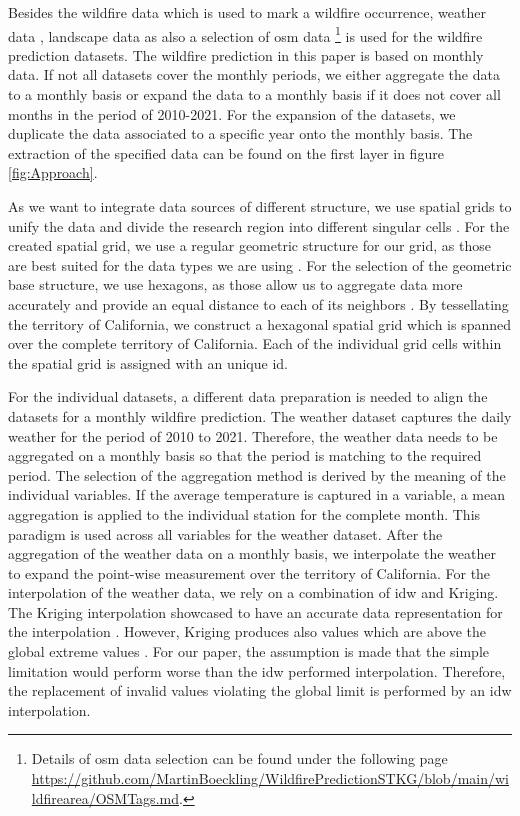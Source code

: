 \documentclass[
]{ceurart}
\begin{document}
Besides the wildfire data \cite{Giglio.2015} which is used to mark a wildfire occurrence, weather data \cite{Menne.2012}, landscape data \cite{Yang.2018} as also a selection of \gls*{osm} data \cite{OpenStreetMapcontributors.2017}\footnote{Details of \gls*{osm} data selection can be found under the following page \url{https://github.com/MartinBoeckling/WildfirePredictionSTKG/blob/main/wildfirearea/OSMTags.md}.} is used for the wildfire prediction datasets. The wildfire prediction in this paper is based on monthly data. If not all datasets cover the monthly periods, we either aggregate the data to a monthly basis or expand the data to a monthly basis if it does not cover all months in the period of 2010-2021. For the expansion of the datasets, we duplicate the data associated to a specific year onto the monthly basis. The extraction of the specified data can be found on the first layer in figure \ref{fig:Approach}.

As we want to integrate data sources of different structure, we use spatial grids to unify the data and divide the research region into different singular cells \cite{Rigaux.2001}. For the created spatial grid, we use a regular geometric structure for our grid, as those are best suited for the data types we are using \cite{Rigaux.2001}. For the selection of the geometric base structure, we use hexagons, as those allow us to aggregate data more accurately \cite{Wang.2018} and provide an equal distance to each of its neighbors \cite{Birch.2007}. By tessellating the territory of California, we construct a hexagonal spatial grid which is spanned over the complete territory of California. Each of the individual grid cells within the spatial grid is assigned with an unique \gls*{id}.

For the individual datasets, a different data preparation is needed to align the datasets for a monthly wildfire prediction. The weather dataset captures the daily weather for the period of 2010 to 2021. Therefore, the weather data needs to be aggregated on a monthly basis so that the period is matching to the required period. The selection of the aggregation method is derived by the meaning of the individual variables. If the average temperature is captured in a variable, a mean aggregation is applied to the individual station for the complete month. This paradigm is used across all variables for the weather dataset. After the aggregation of the weather data on a monthly basis, we interpolate the weather to expand the point-wise measurement over the territory of California. For the interpolation of the weather data, we rely on a combination of \gls*{idw} and Kriging. The Kriging interpolation showcased to have an accurate data representation for the interpolation \cite{Pede.2018}. However, Kriging produces also values which are above the global extreme values \cite{Matheron.1963}. For our paper, the assumption is made that the simple limitation would perform worse than the \gls{idw} performed interpolation. Therefore, the replacement of invalid values violating the global limit is performed by an \gls{idw} interpolation.
\end{document}
